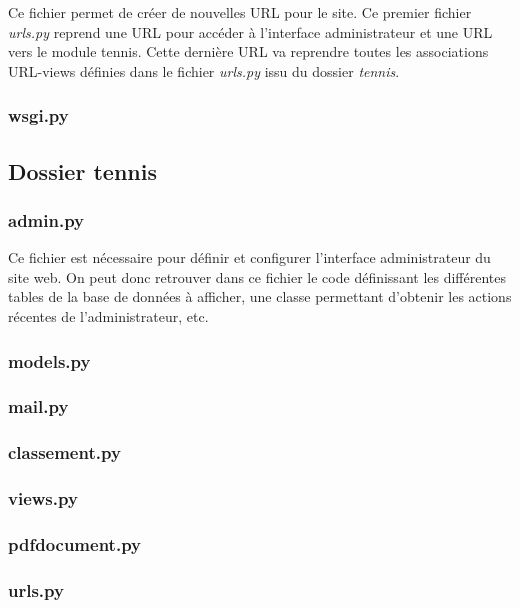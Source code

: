 Ce fichier permet de créer de nouvelles URL pour le site. Ce premier fichier \textit{urls.py} reprend une URL pour accéder à l'interface administrateur et une URL vers le module tennis. Cette dernière URL va reprendre toutes les associations URL-views définies dans le fichier \textit{urls.py} issu du dossier \textit{tennis}.

\subsubsection{wsgi.py}

\subsection{Dossier tennis}

\subsubsection{admin.py}

Ce fichier est nécessaire pour définir et configurer l'interface administrateur du site web. On peut donc retrouver dans ce fichier le code définissant les différentes tables de la base de données à afficher, une classe permettant d'obtenir les actions récentes de l'administrateur, etc.

\subsubsection{models.py}

\subsubsection{mail.py}

\subsubsection{classement.py} 

\subsubsection{views.py}

\subsubsection{pdfdocument.py}

\subsubsection{urls.py}

